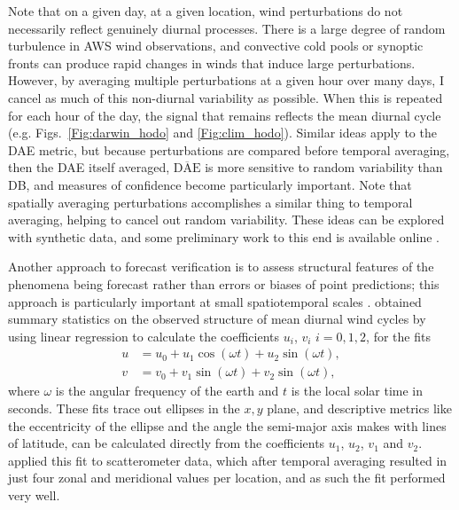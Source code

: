\documentclass[twocol]{ametsoc}
\begin{document}
Note that on a given day, at a given location, wind perturbations do not necessarily reflect genuinely diurnal processes. There is a large degree of random turbulence in AWS wind observations, and convective cold pools or synoptic fronts can produce rapid changes in winds that induce large perturbations. However, by averaging multiple perturbations at a given hour over many days, I cancel as much of this non-diurnal variability as possible. When this is repeated for each hour of the day, the signal that remains reflects the mean diurnal cycle (e.g. Figs.~\ref{Fig:darwin_hodo} and \ref{Fig:clim_hodo}). Similar ideas apply to the DAE metric, but because perturbations are compared before temporal averaging, then the DAE itself averaged, $\overline{\text{DAE}}$ is more sensitive to random variability than DB, and measures of confidence become particularly important. Note that spatially averaging perturbations accomplishes a similar thing to temporal averaging, helping to cancel out random variability. These ideas can be explored with synthetic data, and some preliminary work to this end is available online \citep{short20}.

Another approach to forecast verification is to assess structural features of the phenomena being forecast rather than errors or biases of point predictions; this approach is particularly important at small spatiotemporal scales \citep[e.g.][]{mass02, rife05}. \citet{gille05} obtained summary statistics on the observed structure of mean diurnal wind cycles by using linear regression to calculate the coefficients $u_i$, $v_i$ $i=0,1,2$, for the fits 
\begin{align}
u &= u_0 + u_1 \cos(\omega t) + u_2 \sin(\omega t), \label{Eq:u_h} \\
v &= v_0 + v_1 \sin(\omega t) + v_2 \sin(\omega t), \label{Eq:v_h}
\end{align}
where $\omega$ is the angular frequency of the earth and $t$ is the local solar time in seconds. These fits trace out ellipses in the $x,y$ plane, and descriptive metrics like the eccentricity of the ellipse and the angle the semi-major axis makes with lines of latitude, can be calculated directly from the coefficients $u_1$, $u_2$, $v_1$ and $v_2$. \citet{gille05} applied this fit to scatterometer data, which after temporal averaging resulted in just four zonal and meridional values per location, and as such the fit performed very well.  
\end{document}
